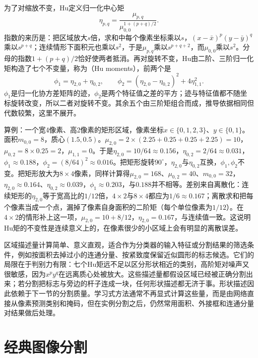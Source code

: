 为了对缩放不变，Hu定义归一化中心矩
\begin{equation}
  \eta_{p,q}=\frac{\mu_{p,q}}{\mu_{0,0}^{1+(p+q)/2}}.
  \label{eq:vision-features-normalized-moment}
\end{equation}
指数的来历是：把区域放大$s$倍，求和中每个像素坐标乘以$s$，$(x-\bar x)^p(y-\bar y)^q$乘以$s^{p+q}$；连续情形下面积元也乘以$s^2$，于是$\mu_{p,q}$乘以$s^{p+q+2}$，而$\mu_{0,0}$乘以$s^2$。分母的指数$1+(p+q)/2$恰好使两者抵消。再对旋转不变，Hu由二阶、三阶归一化矩构造了七个不变量，称为（Hu moments），前两个是
\begin{equation}
  \phi_1=\eta_{2,0}+\eta_{0,2},\qquad
  \phi_2=(\eta_{2,0}-\eta_{0,2})^2+4\eta_{1,1}^2.
  \label{eq:vision-features-hu}
\end{equation}
$\phi_1$是归一化协方差矩阵的迹，$\phi_2$是两个特征值之差的平方；迹与特征值都不随坐标旋转改变，所以二者对旋转不变。其余五个由三阶矩组合而成，推导依据相同但代数较繁，这里不展开。

算例：一个宽4像素、高2像素的矩形区域，像素坐标$x\in\{0,1,2,3\}$、$y\in\{0,1\}$。面积$m_{0,0}=8$，质心$(1.5,0.5)$。$\mu_{2,0}=2\times(2.25+0.25+0.25+2.25)=10$，$\mu_{0,2}=8\times0.25=2$，$\mu_{1,1}=0$。于是$\eta_{2,0}=10/64\approx0.156$，$\eta_{0,2}=2/64\approx0.031$，$\phi_1\approx0.188$，$\phi_2=(8/64)^2\approx0.016$。把矩形旋转$90^\circ$，$\eta_{2,0}$与$\eta_{0,2}$互换，$\phi_1,\phi_2$不变。把矩形放大为$8\times4$像素，同样计算得$\mu_{2,0}=168$、$\mu_{0,2}=40$、$m_{0,0}=32$，$\eta_{2,0}\approx0.164$、$\eta_{0,2}\approx0.039$，$\phi_1\approx0.203$，与$0.188$并不相等。差别来自离散化：连续矩形的$\eta_{2,0}$等于宽高比的$1/12$倍，$4\times2$与$8\times4$都应为$1/6\approx0.167$；离散求和把每个像素当成一个点，漏掉了像素自身面积的二阶矩（每个单位像素为$1/12$）。在$4\times2$的情形补上这一项，$\mu_{2,0}=10+8/12$，$\eta_{2,0}=0.167$，与连续值一致。这说明Hu矩的不变性是连续意义上的，在像素很少的小区域上会有明显的离散误差。

区域描述量计算简单、意义直观，适合作为分类器的输入特征或分割结果的筛选条件，例如按面积去掉过小的连通分量、按紧致度保留近似圆形的标志候选。它们的局限在于判别力有限：七个Hu矩远不足以区分形状相近的类别，高阶矩对噪声又很敏感，因为$x^py^q$在远离质心处被放大。这些描述量都假设区域已经被正确分割出来；若分割把标志与旁边的杆子连成一块，任何形状描述都无济于事。形状描述因此依赖于下一节的分割质量。学习式方法通常不再显式计算这些量，而是由网络直接从像素预测类别和掩码，但在实例分割之后，仍然常用面积、外接框和连通分量对结果做后处理。

\section{经典图像分割}
\label{sec:vision-features-segmentation}

